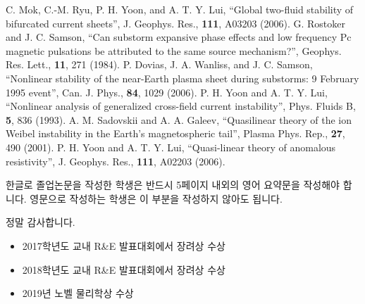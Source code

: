 \documentclass[twoside,11pt]{gshs_thesis}
\begin{document}
\begin{thebibliography}{99}
\begin{onehalfspace}
C. Mok, C.-M. Ryu, P. H. Yoon, and A. T. Y. Lui, ``Global two-fluid stability of bifurcated current sheets'', J. Geophys. Res., {\bf 111}, A03203 (2006).
 G. Rostoker and J. C. Samson, ``Can substorm expansive phase effects and low frequency Pc magnetic pulsations be attributed to the same source mechanism?'', Geophys. Res. Lett., {\bf 11}, 271 (1984).
 P. Dovias, J. A. Wanliss, and J. C. Samson, ``Nonlinear stability of the near-Earth plasma sheet during substorms: 9 February 1995 event'', Can. J. Phys., {\bf 84}, 1029 (2006).
 P. H. Yoon and A. T. Y. Lui, ``Nonlinear analysis of generalized cross-field current instability'', Phys. Fluids B, {\bf 5}, 836 (1993).
 A. M. Sadovskii and A. A. Galeev, ``Quasilinear theory of the ion Weibel instability in the Earth's magnetospheric tail'', Plasma Phys. Rep., {\bf 27}, 490 (2001).
 P. H. Yoon and A. T. Y. Lui, ``Quasi-linear theory of anomalous resistivity'', J. Geophys. Res., {\bf 111}, A02203 (2006).

\end{onehalfspace}\end{thebibliography}

\begin{summary}
한글로 졸업논문을 작성한 학생은 반드시 5페이지 내외의 영어 요약문을 작성해야 합니다. 영문으로 작성하는 학생은 이 부분을 작성하지 않아도 됩니다.
\end{summary}

\begin{acknowledgements}
정말 감사합니다.
\end{acknowledgements}

\begin{researches}
\begin{itemize}
\item{2017학년도 교내 R\&E 발표대회에서 장려상 수상}
\item{2018학년도 교내 R\&E 발표대회에서 장려상 수상}
\item{2019년 노벨 물리학상 수상}
\end{itemize}
\end{researches}
\end{document}
